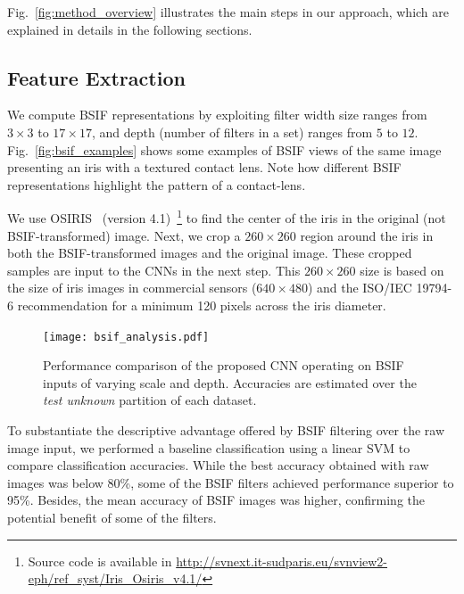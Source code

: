Fig.~\ref{fig:method_overview} illustrates the main steps in our approach, which are explained in details in the following sections.

\subsection{Feature Extraction}

We compute BSIF representations by exploiting filter width size ranges from $3\times3$ to $17\times17$, and depth (\ie number of filters in a set) ranges from $5$ to $12$. Fig.~\ref{fig:bsif_examples} shows some examples of BSIF views of the same image presenting an iris with a textured contact lens. Note how different BSIF representations highlight the pattern of a contact-lens.

We use OSIRIS~\cite{othman2016osiris} (version 4.1)~\footnote{Source code is available in \url{http://svnext.it-sudparis.eu/svnview2-eph/ref_syst/Iris_Osiris_v4.1/}} to find the center of the iris in the original (not BSIF-transformed) image. Next, we crop a $260 \times 260$ region around the iris in both the BSIF-transformed images and the original image. These cropped samples are input to the CNNs in the next step. This $260 \times 260$ size is based on the size of iris images in commercial sensors ($640 \times 480$) and the ISO/IEC 19794-6 recommendation for a minimum 120 pixels across the iris diameter.


%
\begin{figure}[!htb]
    \centering
    \texttt{[image: bsif\_analysis.pdf]}
    \caption{Performance comparison of the proposed CNN operating on BSIF inputs of varying scale and depth. Accuracies are estimated over the \emph{test unknown} partition of each dataset.}
    \label{fig:bsif_analysis}
\end{figure}

To substantiate the descriptive advantage offered by BSIF filtering over the raw image input, we performed a baseline classification using a linear SVM to compare classification accuracies. 
While the best accuracy obtained with raw images was below 80\%, some of the BSIF filters achieved performance superior to 95\%. 
Besides, the mean accuracy of BSIF images was higher, confirming the potential benefit of  some of the filters.

